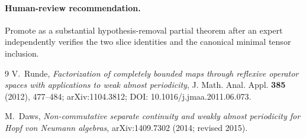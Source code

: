 \documentclass[11pt]{article}
\begin{document}
\paragraph{Human-review recommendation.}
Promote as a substantial hypothesis-removal partial theorem after an expert
independently verifies the two slice identities and the canonical minimal
tensor inclusion.

\begin{thebibliography}{9}
V.~Runde,
\emph{Factorization of completely bounded maps through reflexive operator
spaces with applications to weak almost periodicity},
J. Math. Anal. Appl. \textbf{385} (2012), 477--484;
arXiv:1104.3812; DOI: 10.1016/j.jmaa.2011.06.073.

M.~Daws,
\emph{Non-commutative separate continuity and weakly almost periodicity for
Hopf von Neumann algebras},
arXiv:1409.7302 (2014; revised 2015).
\end{thebibliography}
\end{document}

